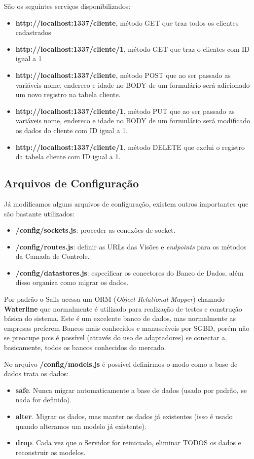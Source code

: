 \documentclass[a4paper,11pt]{article}
\begin{document}
São os seguintes serviços disponibilizados: \vspace{-1em}
\begin{itemize}
  \item \textbf{http://localhost:1337/cliente}, método GET que traz todos os clientes cadastrados
  \item \textbf{http://localhost:1337/cliente/1}, método GET que traz o clientes com ID igual a 1
  \item \textbf{http://localhost:1337/cliente}, método POST que ao ser passado as variáveis nome, endereco e idade no BODY de um formulário será adicionado um novo registro na tabela cliente.
  \item \textbf{http://localhost:1337/cliente/1}, método PUT que ao ser passado as variáveis nome, endereco e idade no BODY de um formulário será modificado os dados do cliente com ID igual a 1.
  \item \textbf{http://localhost:1337/cliente/1}, método DELETE que exclui o registro da tabela cliente com ID igual a 1.
\end{itemize}

\subsection{Arquivos de Configuração}
Já modificamos alguns arquivos de configuração, existem outros importantes que são bastante utilizados: \vspace{-1em}
\begin{itemize}
  \item \textbf{/config/sockets.js}: proceder as conexões de socket.
  \item \textbf{/config/routes.js}: definir as URLs das Visões e \textit{endpoints} para os métodos da Camada de Controle.
  \item \textbf{/config/datastores.js}: especificar os conectores do Banco de Dados, além disso organiza como migrar os dados.
\end{itemize}

Por padrão o Sails acessa um ORM (\textit{Object Relational Mapper}) chamado \textbf{Waterline} que normalmente é utilizado para realização de testes e construção básica do sistema. Este é um excelente banco de dados, mas normalmente as empresas preferem Bancos mais conhecidos e manuseáveis por SGBD, porém não se preocupe pois é possível (através do uso de adaptadores) se conectar a, basicamente, todos os bancos conhecidos do mercado.

No arquivo \textbf{/config/models.js} é possível definirmos o modo como a base de dados trata os dados: \vspace{-1em}
\begin{itemize}
  \item \textbf{safe}. Nunca migrar automaticamente a base de dados (usado por padrão, se nada for definido).
  \item \textbf{alter}. Migrar os dados, mas manter os dados já existentes (isso é usado quando alteramos um modelo já existente).
  \item \textbf{drop}. Cada vez que o Servidor for reiniciado, eliminar TODOS os dados e reconstruir os modelos.
\end{itemize}
\end{document}
